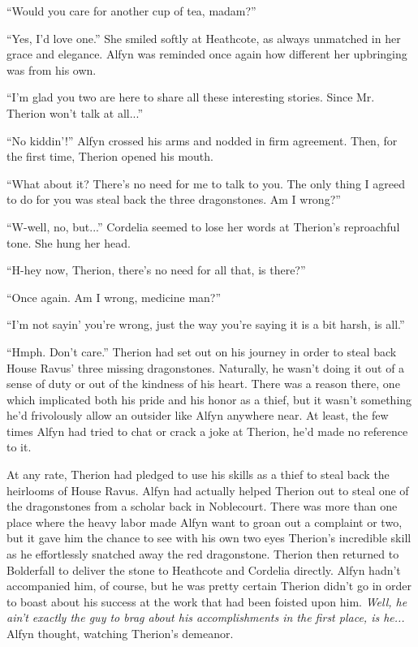 ``Would you care for another cup of tea, madam?''

``Yes, I'd love one.'' She smiled softly at Heathcote, as always unmatched in her grace and elegance. Alfyn was reminded once again how different her upbringing was from his own.

``I'm glad you two are here to share all these interesting stories. Since Mr. Therion won't talk at all...''

``No kiddin'!'' Alfyn crossed his arms and nodded in firm agreement. Then, for the first time, Therion opened his mouth.

``What about it? There's no need for me to talk to you. The only thing I agreed to do for you was steal back the three dragonstones. Am I wrong?''

``W-well, no, but...'' Cordelia seemed to lose her words at Therion's reproachful tone. She hung her head.

``H-hey now, Therion, there's no need for all that, is there?''

``Once again. Am I wrong, medicine man?''

``I'm not sayin' you're wrong, just the way you're saying it is a bit harsh, is all.''

``Hmph. Don't care.'' Therion had set out on his journey in order to steal back House Ravus' three missing dragonstones. Naturally, he wasn't doing it out of a sense of duty or out of the kindness of his heart. There was a reason there, one which implicated both his pride and his honor as a thief, but it wasn't something he'd frivolously allow an outsider like Alfyn anywhere near. At least, the few times Alfyn had tried to chat or crack a joke at Therion, he'd made no reference to it.

At any rate, Therion had pledged to use his skills as a thief to steal back the heirlooms of House Ravus. Alfyn had actually helped Therion out to steal one of the dragonstones from a scholar back in Noblecourt. There was more than one place where the heavy labor made Alfyn want to groan out a complaint or two, but it gave him the chance to see with his own two eyes Therion's incredible skill as he effortlessly snatched away the red dragonstone.  Therion then returned to Bolderfall to deliver the stone to Heathcote and Cordelia directly. Alfyn hadn't accompanied him, of course, but he was pretty certain Therion didn't go in order to boast about his success at the work that had been foisted upon him. \emph{Well, he ain't exactly the guy to brag about his accomplishments in the first place, is he...} Alfyn thought, watching Therion's demeanor.

